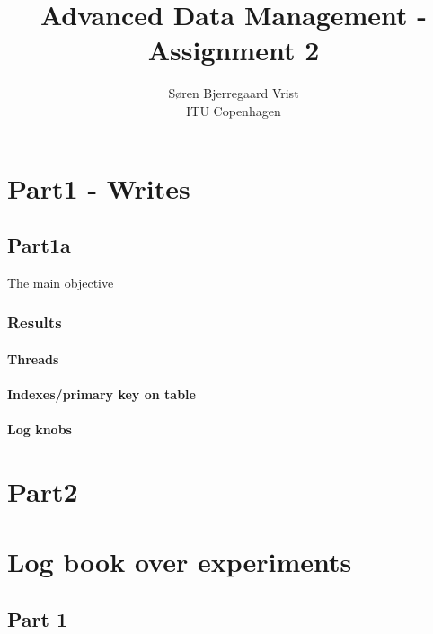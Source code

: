 
\title{Advanced Data Management - Assignment 2}
\author{S\o ren Bjerregaard Vrist\\ITU Copenhagen}


\maketitle

\chapter{Part1 - Writes}
\section{Part1a}
The main objective 
\subsection{Results}
\subsubsection{Threads}
\subsubsection{Indexes/primary key on table}
\subsubsection{Log knobs}


\chapter{Part2}


\chapter{Log book over experiments}

\section{Part 1}

